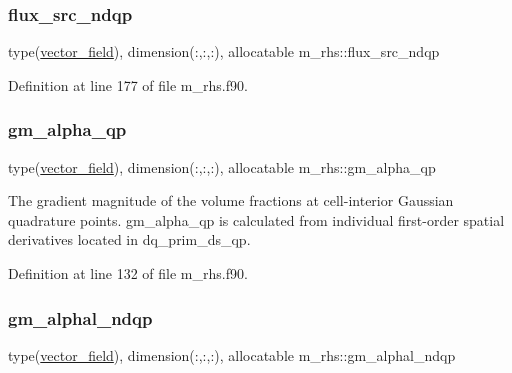 \mbox{\label{namespacem__rhs_aec977e848537c8ecd3317aefd2bd8607}} 
\subsubsection{\texorpdfstring{flux\+\_\+src\+\_\+ndqp}{flux\_src\_ndqp}}
{\footnotesize\ttfamily type(\hyperlink{structm__derived__types_1_1vector__field}{vector\+\_\+field}), dimension(\+:,\+:,\+:), allocatable m\+\_\+rhs\+::flux\+\_\+src\+\_\+ndqp}



Definition at line 177 of file m\+\_\+rhs.\+f90.

\mbox{\label{namespacem__rhs_a1141883715f63c7b9d54dde459434fcc}} 
\subsubsection{\texorpdfstring{gm\+\_\+alpha\+\_\+qp}{gm\_alpha\_qp}}
{\footnotesize\ttfamily type(\hyperlink{structm__derived__types_1_1vector__field}{vector\+\_\+field}), dimension(\+:,\+:,\+:), allocatable m\+\_\+rhs\+::gm\+\_\+alpha\+\_\+qp}



The gradient magnitude of the volume fractions at cell-\/interior Gaussian quadrature points. gm\+\_\+alpha\+\_\+qp is calculated from individual first-\/order spatial derivatives located in dq\+\_\+prim\+\_\+ds\+\_\+qp. 



Definition at line 132 of file m\+\_\+rhs.\+f90.

\mbox{\label{namespacem__rhs_a5886ad6e79bba7c4cf7fa1475aac824a}} 
\subsubsection{\texorpdfstring{gm\+\_\+alphal\+\_\+ndqp}{gm\_alphal\_ndqp}}
{\footnotesize\ttfamily type(\hyperlink{structm__derived__types_1_1vector__field}{vector\+\_\+field}), dimension(\+:,\+:,\+:), allocatable m\+\_\+rhs\+::gm\+\_\+alphal\+\_\+ndqp}



